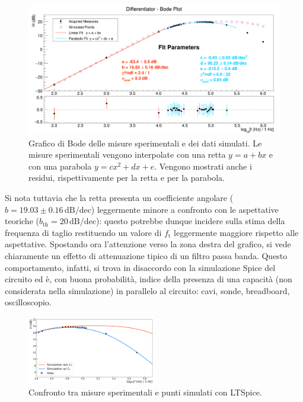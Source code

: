 \documentclass[a4paper,11pt]{article} %
\begin{document}
\begin{figure}[H]
	\centering
	\includegraphics[width=\linewidth]{../Plots/Report_Plots/diff_bode.png}
	\caption{\small Grafico di Bode delle misure sperimentali e dei dati simulati. Le misure sperimentali vengono
	interpolate con una retta $y = a + bx$ e con una parabola $y = cx^2+dx+e$. Vengono mostrati anche i residui, 
	rispettivamente per la retta e per la parabola.}
	\label{i:diff_bode}
\end{figure}

\noindent Si nota tuttavia che la retta presenta un coefficiente angolare ($b = 19.03\pm 0.16\,\text{dB/dec}$)
leggermente minore a confronto con le aspettative teoriche ($b_{\text{th}}=20\,\text{dB/dec}$): questo potrebbe dunque
incidere sulla stima della frequenza di taglio restituendo un valore di $f_{\text{t}}$ leggermente maggiore rispetto
alle aspettative. Spostando ora l'attenzione verso la zona destra del grafico, si vede chiaramente un effetto di
attenuazione tipico di un filtro passa banda. Questo comportamento, infatti, si trova in disaccordo con la simulazione
Spice del circuito ed è, con buona probabilità, indice della presenza di una capacità (non considerata nella
simulazione) in parallelo al circuito: cavi, sonde, breadboard, oscilloscopio. 

\begin{figure}
	\centering
	\includegraphics[width=0.5\textwidth]{../Plots/Report_Plots/diff_sim_comp.png}
	\caption{\small Confronto tra misure sperimentali e punti simulati con LTSpice.}
	\label{i:diff_sim_comp}
\end{figure}
\end{document}
